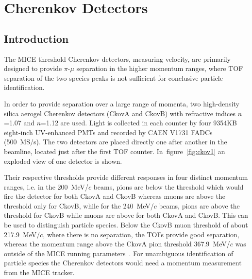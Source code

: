 \graphicspath{{03-Ckov/Figures/}}

\section{Cherenkov Detectors}
\label{Sect:Ckov}

\subsection{Introduction}
\label{SubSect:Ckov_Intro}

The MICE threshold Cherenkov detectors, measuring velocity, are primarily designed to provide $\pi$-$\mu$ separation in the higher momentum ranges, where TOF separation of the two species peaks is not sufficient for conclusive particle identification.

In order to provide separation over a large range of momenta, two high-density silica aerogel Cherenkov detectors (CkovA and CkovB) with refractive indices $n$=1.07 and $n$=1.12 are used.
Light is collected in each counter by four 9354KB eight-inch UV-enhanced PMTs and recorded by CAEN V1731 FADCs (500~MS/s).
The two detectors are placed directly one after another in the beamline, located just after the first TOF counter. In~figure~\ref{fig:ckov1} an exploded view of one detector is shown.

Their respective thresholds provide different responses in four distinct momentum ranges, i.e. in the 200~MeV/$c$ beams, pions are below the threshold which would fire the detector for both CkovA and CkovB whereas muons are above the threshold only for CkovB, while for the 240~MeV/$c$ beams, pions are above the threshold for CkovB while muons are above for both CkovA and CkovB.
This can be used to distinguish particle species.
Below the CkovB muon threshold of about 217.9~MeV/$c$, where there is no separation, the TOFs provide good separation, whereas the momentum range above the CkovA pion threshold 367.9~MeV/$c$ was outside of the MICE running parameters~\cite{NOTE473}.
For unambiguous identification of particle species the Cherenkov detectors would need a momentum measurement from the MICE tracker.

